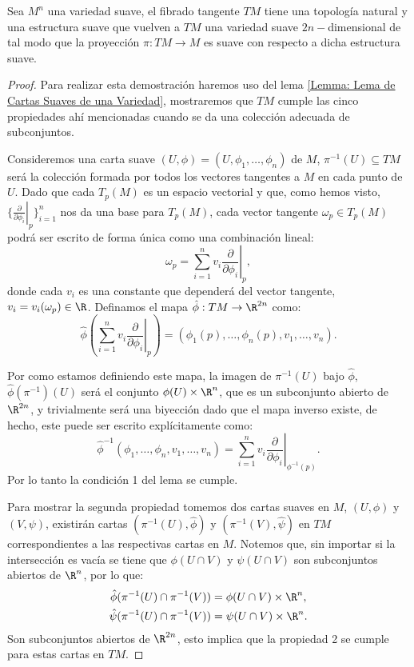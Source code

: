 \begin{theorem}\label{Teorema: Estructura de Variedad del Fibrado Tangente}
	Sea $M^n$ una variedad suave, el fibrado tangente $TM$ tiene una topología natural y una estructura suave que vuelven a $TM$ una variedad suave $2n-$dimensional de tal modo que la proyección $\pi: TM \to M$ es suave con respecto a dicha estructura suave.
\end{theorem}

\begin{proof}
	Para realizar esta demostración haremos uso del lema \ref{Lemma: Lema de Cartas Suaves de una Variedad}, mostraremos que $TM$ cumple las cinco propiedades ahí mencionadas cuando se da una colección adecuada de subconjuntos.

	Consideremos una carta suave $(U,\phi)=(U,\phi_1,\dots,\phi_n)$ de $M$, $\pi^{-1}(U) \subseteq TM$ será la colección formada por todos los vectores tangentes a $M$ en cada punto de $U$. Dado que cada $T_p(M)$ es un espacio vectorial y que, como hemos visto, $\{\left. \frac{\partial}{\partial \phi_{i}} \right|_{p}\}_{i=1}^{n}$ nos da una base para $T_p(M)$, cada vector tangente $\omega_p \in T_p(M)$ podrá ser escrito de forma única como una combinación lineal:
	\[
		\omega_p = \sum_{i=1}^{n} v_i \left. \frac{\partial}{\partial \phi_{i}}\right|_{p},
	\]
	donde cada $v_i$ es una constante que dependerá del vector tangente, $v_i = v_i(\omega_p) \in \R$. Definamos el mapa $\hat{\phi}: TM \to \R^{2n}$ como:
	\[
		\hat{\phi} \left(\sum_{i=1}^{n} v_i
		\left. \frac{\partial}{\partial \phi_{i}}\right|_{p} \right)
		=
		\left(\phi_1(p), \dots, \phi_n(p), v_1, \dots, v_n \right).
	\]

	Por como estamos definiendo este mapa, la imagen de $\pi^{-1}(U)$ bajo $\hat{\phi}$, $\hat{\phi}(\pi^{-1})(U)$ será el conjunto $\phi(U) \times \R^n$, que es un subconjunto abierto de $\R^{2n}$, y trivialmente será una biyección dado que el mapa inverso existe, de hecho, este puede ser escrito explícitamente como:
	\[
		\hat{\phi}^{-1}(\phi_{1},\dots, \phi_{n}, v_1, \dots, v_n)
		=
		\sum_{i=1}^{n} v_i \left. \frac{\partial}{\partial \phi_i} \right|_{\phi^{-1}(p)}.
	\]
	Por lo tanto la condición 1 del lema se cumple.

	Para mostrar la segunda propiedad tomemos dos cartas suaves en $M$, $(U,\phi)$ y $(V,\psi)$, existirán cartas $(\pi^{-1}(U),\hat{\phi})$ y $(\pi^{-1}(V),\hat{\psi})$ en $TM$ correspondientes a las respectivas cartas en $M$. Notemos que, sin importar si la intersección es vacía se tiene que $\phi(U \cap V)$ y $\psi(U \cap V)$ son subconjuntos abiertos de $\R^n$, por lo que:
	\begin{align*}
		\hat{\phi}(\pi^{-1}(U) \cap \pi^{-1}(V)) & =
		\phi(U \cap V) \times \R^n,                  \\
		\hat{\psi}(\pi^{-1}(U) \cap \pi^{-1}(V)) & =
		\psi(U \cap V) \times \R^n.                  \\
	\end{align*}
	Son subconjuntos abiertos de $\R^{2n}$, esto implica que la propiedad 2 se cumple para estas cartas en $TM$.


\end{proof}
